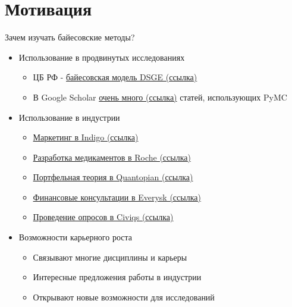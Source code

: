 \documentclass{beamer}
\begin{document}
\section{Мотивация}
\begin{frame}{Зачем изучать байесовские методы?}
    \begin{itemize}
        \item Использование в продвинутых исследованиях
        \begin{itemize}
            \item ЦБ РФ - \href{https://www.cbr.ru/Content/Document/File/119374/bDSGE.pdf}{байесовская модель DSGE (ссылка)}
            \item В Google Scholar \href{https://scholar.google.com/scholar?hl=ru&as_sdt=2005&sciodt=0,5&cites=6936955228135731011&scipsc=&q=&scisbd=1}{очень много (ссылка)} статей, использующих PyMC
        \end{itemize}

        \item Использование в индустрии
        \begin{itemize}
            \item \href{https://engineering.hellofresh.com/bayesian-media-mix-modeling-using-pymc3-for-fun-and-profit-2bd4667504e6}{Маркетинг в Indigo (ссылка)}
            \item \href{https://pubmed.ncbi.nlm.nih.gov/27442271/}{Разработка медикаментов в Roche (ссылка)}
            \item \href{https://github.com/quantopian/bayesalpha}{Портфельная теория в Quantopian (ссылка)}
            \item \href{https://support.everysk.com/hc/en-us/articles/1500001040721-Private-Investments}{Финансовые консультации в Everysk (ссылка)}
            \item \href{https://discourse.pymc.io/t/job-opening-director-of-data-science-at-civiqs/1895}{Проведение опросов в Civiqs (ссылка)}
        \end{itemize}
        \item Возможности карьерного роста
        \begin{itemize}
            \item Связывают многие дисциплины и карьеры
            \item Интересные предложения работы в индустрии
            \item Открывают новые возможности для исследований
        \end{itemize}
    \end{itemize}
\end{frame}
\end{document}
